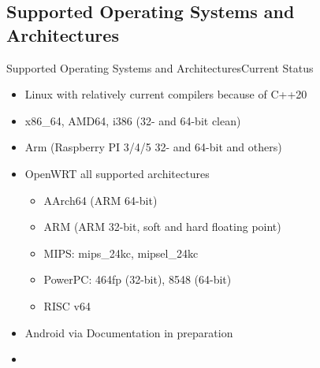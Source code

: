 ﻿\subsection{Supported Operating Systems and Architectures}

\begin{frame}{Supported Operating Systems and Architectures}{Current Status}
   \begin{description}
     \item [Operating Systems]
     \begin{itemize}
       \item Linux with relatively current compilers because of C++20
     \end{itemize}
     \item [Processor Architectures]
     \begin{itemize}
       \item \alert{x86\_{}64}, \alert{AMD64}, \alert{i386} (32- and 64-bit clean)
       \item \alert{Arm} (Raspberry PI 3/4/5 32- and 64-bit and others)
       \item \alert{OpenWRT} \href{https://openwrt.org/}{} all supported architectures
       \begin{itemize}
         \item AArch64 (ARM 64-bit)
         \item ARM (ARM 32-bit, soft and hard floating point)
         \item MIPS: mips\_24kc, mipsel\_24kc
         \item PowerPC: 464fp (32-bit), 8548 (64-bit)
         \item RISC v64
       \end{itemize}
       \item \alert{Android} via \href{https://termux.dev/en/}{} {\scriptsize Documentation in preparation}
       \item {}
     \end{itemize}
   \end{description}
\end{frame}

